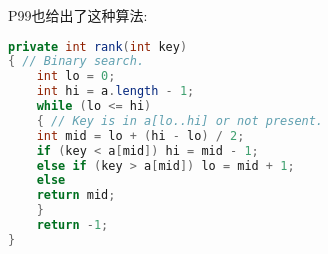 \cite{sedgewick}P99也给出了这种算法:

\begin{lstlisting}[language=Java]
private int rank(int key)
{ // Binary search.
    int lo = 0;
    int hi = a.length - 1;
    while (lo <= hi)
    { // Key is in a[lo..hi] or not present.
	int mid = lo + (hi - lo) / 2;
	if (key < a[mid]) hi = mid - 1;
	else if (key > a[mid]) lo = mid + 1;
	else
	return mid;
    }
    return -1;
}

\end{lstlisting}








